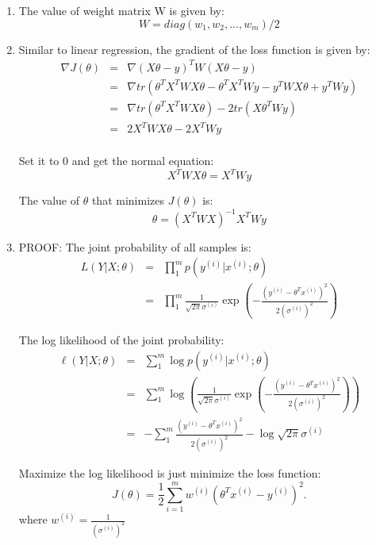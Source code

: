 \begin{answer}


\begin{enumerate}

\item The value of weight matrix W is given by:
\begin{equation*}
W = diag(w_1,w_2,...,w_m)/2
\end{equation*}

\item Similar to linear regression, the gradient of the loss function is given by:
\begin{eqnarray*}
\nabla J(\theta) 
    &=& \nabla (X\theta - {y})^T W (X\theta - {y}) \\
    &=& \nabla tr(\theta^T X^T W X\theta - \theta^T X^T W y - y^T W X\theta + y^T W y) \\
    &=& \nabla tr(\theta^T X^T W X\theta) - 2tr(X\theta^T W y) \\
    &=& 2 X^T W X\theta - 2 X^T W y \\
\end{eqnarray*}

Set it to 0 and get the normal equation:
\begin{equation*}
    X^T W X\theta = X^T W y 
\end{equation*}

The value of $\theta$ that minimizes $J(\theta)$ is:
\begin{equation*}
    \theta = (X^T W X)^{-1} X^T W y 
\end{equation*}


\item PROOF:
The joint probability of all samples is:
\begin{eqnarray*}
L(Y|X;\theta) 
    &=& \prod_1^m p(y^{(i)} | x^{(i)} ; \theta) \\
    &=& \prod_1^m \frac{1}{\sqrt{2\pi}\sigma^{(i)}} \exp\left(-
    \frac{(y^{(i)} - \theta^Tx^{(i)})^2}{2(\sigma^{(i)})^2}\right)
\end{eqnarray*}

The log likelihood of the joint probability:
\begin{eqnarray*}
\ell(Y|X;\theta) 
    &=& \sum_1^m \log p(y^{(i)} | x^{(i)} ; \theta) \\
    &=& \sum_1^m \log \left(\frac{1}{\sqrt{2\pi}\sigma^{(i)}} \exp\left(-
    \frac{(y^{(i)} - \theta^Tx^{(i)})^2}{2(\sigma^{(i)})^2}\right) \right) \\
    &=& -\sum_1^m \frac{(y^{(i)} - \theta^Tx^{(i)})^2}{2(\sigma^{(i)})^2} - \log \sqrt{2\pi}\sigma^{(i)}
\end{eqnarray*}

Maximize the log likelihood is just minimize the loss function:
\begin{equation*}
	J(\theta) = \frac{1}{2} \sum_{i=1}^m w^{(i)}
		\left(\theta^Tx^{(i)} - y^{(i)}\right)^2.
\end{equation*}
where $w^{(i)} = \frac{1}{(\sigma^{(i)})^2}$

\end{enumerate}
\end{answer}
